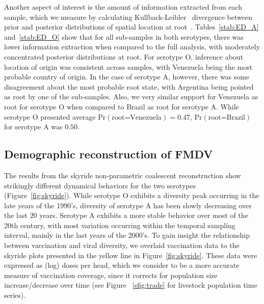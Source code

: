\documentclass[10pt]{article}
\begin{document}
Another aspect of interest is the amount of information extracted from each sample, which we measure by calculating Kullback-Leibler~\cite{KL} divergence between prior and posterior distributions of spatial location at root~\cite{roots}.
Tables~\ref{stab:ED_A} and~\ref{stab:ED_O} show that for all sub-samples in both serotypes, there was lower information extraction when compared to the full analysis, with moderately concentrated posterior distributions at root.
For serotype O, inference about location of origin was consistent across samples, with Venezuela being the most probable country of origin.
In the case of serotype A, however, there was some disagreement about the most probable root state, with Argentina being pointed as root by one of the sub-samples.
Also, we very similar support for Venezuela as root for serotype O when compared to Brazil as root for serotype A.
While serotype O presented average $\mbox{Pr}(\text{root=Venezuela})=0.47$, $\mbox{Pr}(\text{root=Brazil})$ for serotype A was $0.50$.

\subsection*{Demographic reconstruction of FMDV}

The results from the skyride non-parametric coalescent reconstruction show strikingly different dynamical behaviors for the two serotypes (Figure~\ref{fig:skyride}).
While serotype O exhibits a diversity peak occurring in the late years of the 1990's, diversity of serotype A has been slowly decreasing over the last $20$ years.
Serotype A exhibits a more stable behavior over most of the 20th century, with most variation occurring within the temporal sampling interval, mainly in the last years of the 2000's.
To gain insight the relationship between vaccination and viral diversity, we overlaid vaccination data to the skyride plots presented in the yellow line in Figure~\ref{fig:skyride}.
These data were expressed as (log) doses per head, which we consider to be a more accurate measure of vaccination coverage, since it corrects for population size increase/decrease over time (see Figure ~\ref{sfig:trade} for livestock population time series). 
\end{document}
